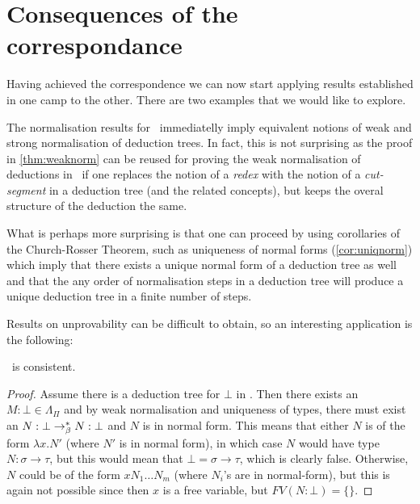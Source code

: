 \section{Consequences of the correspondance}

Having achieved the correspondence we can now start applying results
established in one camp to the other. There are two examples that we would like
to explore.

The normalisation results for \stlambda\ immediatelly imply equivalent notions
of weak and strong normalisation of deduction trees. In fact, this is not
surprising as the proof in \ref{thm:weaknorm} can be reused for proving the
weak normalisation of deductions in \implnpi\ if one replaces the notion of a
\emph{redex} with the notion of a \emph{cut-segment} in a deduction tree (and the
related concepts), but keeps the overal structure of the deduction the same.

What is perhaps more surprising is that one can proceed by using corollaries of
the Church-Rosser Theorem, such as uniqueness of normal forms
(\ref{cor:uniqnorm}) which imply that there exists a unique normal form of a
deduction tree as well and that the any order of normalisation steps in a
deduction tree will produce a unique deduction tree in a finite number of steps.

Results on unprovability can be difficult to obtain, so an interesting
application is the following:

\begin{proposition}\implnpi\ is consistent.\end{proposition}
\begin{proof}
    Assume there is a deduction tree for $\bot$ in \implnpi. Then there exists
    an $M\!:\!\bot \in \Lambda_\Pi$ and by weak normalisation and uniqueness of
    types, there must exist an $N:\bot \rightarrow_\beta^* N:\bot$ and $N$ is in normal
    form. This means that either $N$ is of the form $\lambda x. N'$ (where $N'$
    is in normal form), in which case $N$ would have type $N:\sigma\to\tau$,
    but this would mean that $\bot = \sigma\to\tau$, which is clearly false.
    Otherwise, $N$ could be of the form $x N_1 \ldots N_m$ (where $N_i$'s are
    in normal-form), but this is again not possible since then $x$ is a free
    variable, but $FV(N:\bot) = \{\}$.
\end{proof}
